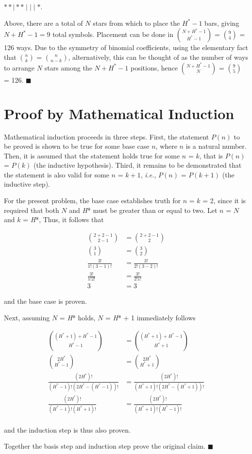 \begin{center}
$* * \mid * * \mid \mid \mid *$.
\end{center}

\noindent Above, there are a total of $N$ stars from which to place the $H^* - 1$ bars, giving $N + H^* - 1 = 9$ total symbols. Placement can be done in ${N + H^* - 1}\choose{H^* - 1}$ = ${9}\choose{4}$ = 126 ways. Due to the symmetry of binomial coefficients, using the elementary fact that ${n}\choose{k}$ = ${n}\choose{n-k}$, alternatively, this can be thought of as the number of ways to arrange $N$ stars among the $N + H^* - 1$ positions, hence ${N + H^* - 1}\choose{N}$ = ${9}\choose{5}$ = 126. $\blacksquare$ 

\section{Proof by Mathematical Induction}

Mathematical induction proceeds in three steps. First, the statement $P(n)$ to be proved is shown to be true for some base case $n$, where $n$ is a natural number. Then, it is assumed that the statement holds true for some $n$ = $k$, that is $P(n)$ = $P(k)$ (the inductive hypothesis). Third, it remains to be demonstrated that the statement is also valid for some $n$ = $k+1$, \textit{i.e.}, $P(n)$ = $P(k+1)$ (the inductive step).

\vspace{5mm}

For the present problem, the base case establishes truth for $n$ = $k$ = 2, since it is required that both $N$ and \textit{H}* must be greater than or equal to two. Let $n$ = $N$ and $k$ = \textit{H}*, Thus, it follows that

\begin{align*}
\binom{2 + 2 - 1}{2 - 1} &= \binom{2 + 2 - 1}{2} \\
\binom{3}{1} &= \binom{3}{2} \\
\frac{3!}{1!(3-1)!} &= \frac{3!}{2!(3-2)!} \\
\frac{3!}{1!2!} &= \frac{3!}{2!1!} \\
3 &= 3
\end{align*}

\noindent and the base case is proven.

\vspace{5mm}

Next, assuming $N$ = \textit{H}* holds,  $N$ = \textit{H}* + 1 immediately follows

\begin{align*}
\binom{(H^* + 1) + H^* - 1}{H^* - 1} &= \binom{(H^* + 1) + H^* - 1}{H^* + 1} \\
\binom{2H^*}{H^* - 1} &= \binom{2H^*}{H^* + 1} \\
\frac{(2H^*)!}{(H^* - 1)!(2H^* - (H^* - 1))!} &= \frac{(2H^*)!}{(H^* + 1)!(2H^* - (H^* + 1))!} \\
\frac{(2H^*)!}{(H^* - 1)!(H^* + 1)!} &= \frac{(2H^*)!}{(H^* + 1)!(H^* - 1)!} \\
\end{align*}

\noindent and the induction step is thus also proven.

\vspace{5mm}  

Together the basis step and induction step prove the original claim. $\blacksquare$ 

